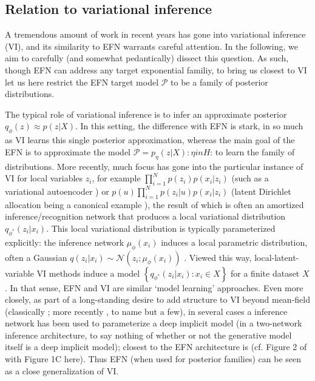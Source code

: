 \documentclass{article}
\begin{document}
 \subsection{Relation to variational inference}
 
A tremendous amount of work in recent years has gone into variational inference (VI), and its similarity to EFN warrants careful attention. 
In the following, we aim to carefully (and somewhat pedantically) dissect this question.  
As such, though EFN can address any target exponential familiy, to bring us closest to VI let us here restrict the EFN target model $\mathcal{P}$ to be a family of posterior distributions.  

The typical role of variational inference is to infer an approximate posterior $q_\phi(z) \approx p(z |X)$.  
In this setting, the difference with EFN is stark, in so much as VI learns this single posterior approximation, whereas the main goal of the EFN is to approximate the model $\mathcal{P} = p_\eta(z|X): \eta in H$: to learn the family of distributions.  
More recently, much focus has gone into the particular instance of VI for local variables $z_i$, for example $\prod_{i=1}^N p(z_i)p(x_i | z_i)$ (such as a variational autoencoder \cite{Kingma:2013aa}) or  $p(u)\prod_{i=1}^N p(z_i|u)p(x_i | z_i)$ (latent Dirichlet allocation being a canonical example \cite{blei2003latent,blei2017variational}), the result of which is often an amortized inference/recognition network that produces a local variational distribution $q_{\phi^*}(z_i | x_i)$.  
This local variational distribution is typically parameterized explicitly: the inference network $\mu_\phi(x_i)$ induces a local parametric distribution, often a Gaussian $q(z_i | x_i) \sim \mathcal{N}\left(z_i; \mu_\phi(x_i)\right)$ \cite[for example]{Kingma:2013aa}.  Viewed this way, local-latent-variable VI methods induce a model $\left\{  q_{\phi^*}(z_i | x_i) : x_i \in X \right\}$ for a finite dataset $X$.   In that sense, EFN and VI are similar `model learning' approaches.
Even more closely, as part of a long-standing desire to add structure to VI beyond mean-field (classically \cite{saul1996exploiting, barber1999tractable}; more recently \cite{hoffman2015stochastic,tran2015copula}, to name but a few), in several cases a inference network has been used to parameterize a deep implicit model (in a two-network inference architecture, to say nothing of whether or not the generative model itself is a deep implicit model); closest to the EFN architecture is \cite{rezende2015variational} (cf. Figure 2 of \cite{rezende2015variational} with Figure 1C here).   Thus EFN (when used for posterior families) can be seen as a close generalization of VI.   
\end{document}
